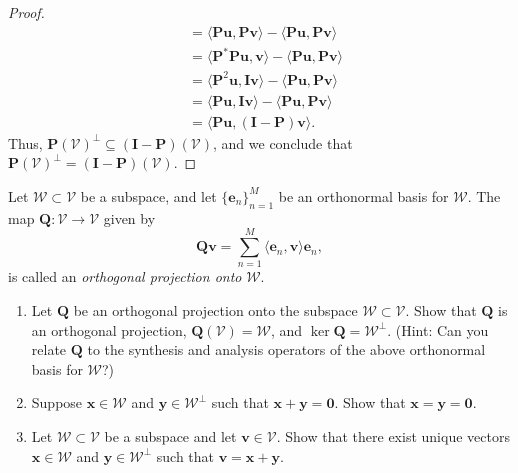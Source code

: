 \documentclass[12pt]{amsart}
\newcommand{\1}{\mathbbm{1}}
\numberwithin{equation}{section}
\numberwithin{Theorem}{section}
\theoremstyle{plain} %
\theoremstyle{definition}
\theoremstyle{remark}
\begin{document}
\begin{enumerate}[1.]
\begin{enumerate}[(a)]
\begin{proof}
\begin{align*}
			&= \langle \mathbf{P} \mathbf{u}, \mathbf{P} \mathbf{v} \rangle 
				- \langle \mathbf{P} \mathbf{u}, \mathbf{P} \mathbf{v} \rangle \\
			&= \langle \mathbf{P^*}\mathbf{P} \mathbf{u}, \mathbf{v} \rangle 
				- \langle \mathbf{P} \mathbf{u}, \mathbf{P} \mathbf{v} \rangle \\
			&= \langle \mathbf{P}^2 \mathbf{u}, \mathbf{I} \mathbf{v} \rangle 
				- \langle \mathbf{P} \mathbf{u}, \mathbf{P} \mathbf{v} \rangle \\
			&= \langle \mathbf{P} \mathbf{u}, \mathbf{I} \mathbf{v} \rangle 
				- \langle \mathbf{P} \mathbf{u}, \mathbf{P} \mathbf{v} \rangle \\
			&= \langle \mathbf{P} \mathbf{u}, (\mathbf{I}-\mathbf{P}) \mathbf{v} \rangle .
		\end{align*}
		Thus,
		\(\mathbf{P}(\mathcal{V})^{\bot} \subseteq (\mathbf{I}-\mathbf{P})(\mathcal{V})\),
		and we conclude that 
		\(\mathbf{P}(\mathcal{V})^{\bot} = (\mathbf{I}-\mathbf{P})(\mathcal{V})\).
	\end{proof}
	
\end{enumerate}

\clearpage

\noindent Let \(\mathcal{W}\subset\mathcal{V}\) be a subspace, and let \(\{\mathbf{e}_{n}\}_{n=1}^{M}\) be an orthonormal basis for \(\mathcal{W}\). The map \(\mathbf{Q}:\mathcal{V}\to\mathcal{V}\) given by
\[\mathbf{Qv} = \sum_{n=1}^{M}\langle \mathbf{e}_{n},\mathbf{v}\rangle\mathbf{e}_{n},\]
is called an \textit{orthogonal projection onto }\(\mathcal{W}\).\bigskip

\begin{enumerate}
\addtocounter{enumii}{3}

\item  Let \(\mathbf{Q}\) be an orthogonal projection onto the subspace \(\mathcal{W}\subset\mathcal{V}\). Show that \(\mathbf{Q}\) is an orthogonal projection, \(\mathbf{Q}(\mathcal{V}) = \mathcal{W}\), and \(\operatorname{ker}\mathbf{Q} = \mathcal{W}^{\bot}\). (Hint: Can you relate \(\mathbf{Q}\) to the synthesis and analysis operators of the above orthonormal basis for \(\mathcal{W}\)?)\bigskip

\item Suppose \(\mathbf{x}\in\mathcal{W}\) and \(\mathbf{y}\in\mathcal{W}^{\bot}\) such that \(\mathbf{x}+\mathbf{y}=\mathbf{0}\). Show that \(\mathbf{x}=\mathbf{y}=\mathbf{0}\).\bigskip

\item Let \(\mathcal{W}\subset\mathcal{V}\) be a subspace and let \(\mathbf{v}\in\mathcal{V}\). Show that there exist unique vectors \(\mathbf{x}\in\mathcal{W}\) and \(\mathbf{y}\in\mathcal{W}^{\bot}\) such that \(\mathbf{v} = \mathbf{x}+\mathbf{y}\).


\end{enumerate}
\end{enumerate}
\end{document}
